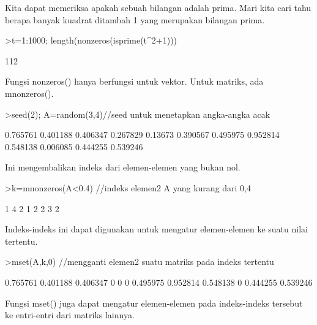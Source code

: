\documentclass[a4paper,10pt]{article}
\begin{document}
\begin{eulernotebook}
\begin{eulercomment}
\begin{eulercomment}
\begin{eulercomment}
Kita dapat memeriksa apakah sebuah bilangan adalah prima. Mari kita
cari tahu berapa banyak kuadrat ditambah 1 yang merupakan bilangan
prima.
\end{eulercomment}
\begin{eulerprompt}
>t=1:1000; length(nonzeros(isprime(t^2+1)))
\end{eulerprompt}
\begin{euleroutput}
  112
\end{euleroutput}
\begin{eulercomment}
Fungsi nonzeros() hanya berfungsi untuk vektor. Untuk matriks, ada
mnonzeros().
\end{eulercomment}
\begin{eulerprompt}
>seed(2); A=random(3,4)//seed untuk menetapkan angka-angka acak
\end{eulerprompt}
\begin{euleroutput}
       0.765761      0.401188      0.406347      0.267829 
        0.13673      0.390567      0.495975      0.952814 
       0.548138      0.006085      0.444255      0.539246 
\end{euleroutput}
\begin{eulercomment}
Ini mengembalikan indeks dari elemen-elemen yang bukan nol.
\end{eulercomment}
\begin{eulerprompt}
>k=mnonzeros(A<0.4) //indeks elemen2 A yang kurang dari 0,4
\end{eulerprompt}
\begin{euleroutput}
              1             4 
              2             1 
              2             2 
              3             2 
\end{euleroutput}
\begin{eulercomment}
Indeks-indeks ini dapat digunakan untuk mengatur elemen-elemen ke
suatu nilai tertentu.
\end{eulercomment}
\begin{eulerprompt}
>mset(A,k,0) //mengganti elemen2 suatu matriks pada indeks tertentu
\end{eulerprompt}
\begin{euleroutput}
       0.765761      0.401188      0.406347             0 
              0             0      0.495975      0.952814 
       0.548138             0      0.444255      0.539246 
\end{euleroutput}
\begin{eulercomment}
Fungsi mset() juga dapat mengatur elemen-elemen pada indeks-indeks
tersebut ke entri-entri dari matriks lainnya.

\end{eulercomment}
\end{eulercomment}
\end{eulercomment}
\end{eulernotebook}
\end{document}
